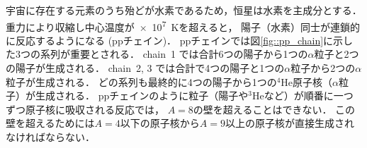 \documentclass[../master]{subfiles}
\begin{document}
宇宙に存在する元素のうち殆どが水素であるため，恒星は水素を主成分とする．
重力により収縮し中心温度が\SI{e7}{\kelvin}を超えると，
陽子（水素）同士が連鎖的に反応するようになる (ppチェイン)．
ppチェインでは図\ref{fig::pp_chain}に示した3つの系列が重要とされる．
chain~1 では合計6つの陽子から1つの$\alpha$粒子と2つの陽子が生成される．
chain~2, 3 では合計で4つの陽子と1つの$\alpha$粒子から2つの$\alpha$粒子が生成される．
どの系列も最終的に4つの陽子から1つの${}^{4}\mathrm{He}$原子核（$\alpha$粒子）が生成される．
ppチェインのように粒子（陽子や${}^{3}\mathrm{He}$など）が順番に一つずつ原子核に吸収される反応では，
$A = 8$の壁を超えることはできない．
この壁を超えるためには$A = 4$以下の原子核から$A = 9$以上の原子核が直接生成されなければならない．
\end{document}
